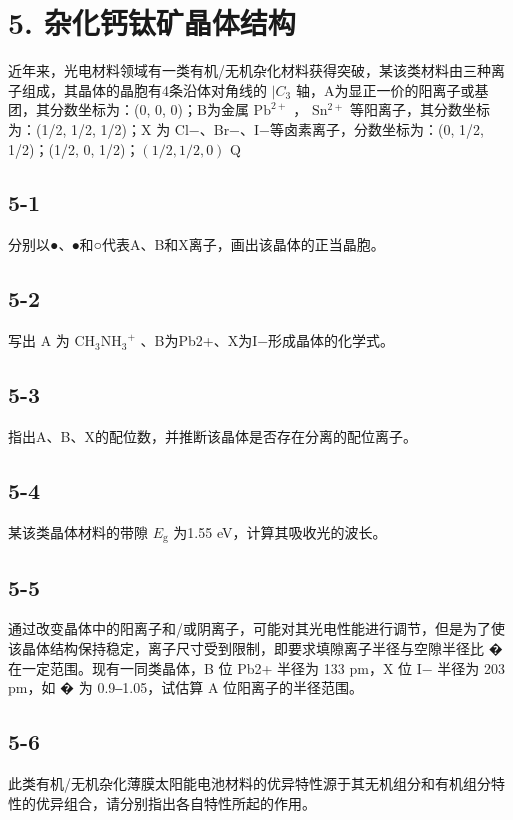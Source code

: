\section*{5. 杂化钙钛矿晶体结构}
近年来，光电材料领域有⼀类有机/⽆机杂化材料获得突破，某该类材料由三种离⼦组成，其晶体的晶胞有4条沿体对⻆线的 $\lvert C _ { 3 }$ 轴，A为显正⼀价的阳离⼦或基团，其分数坐标为：(0, 0, 0)；B为⾦属 $\mathrm { P b ^ { 2 + } }$ ， $\mathrm { S n ^ { 2 + } }$ 等阳离⼦，其分数坐标为：(1/2, 1/2, 1/2)；X 为 Cl−、Br−、I−等⻧素离⼦，分数坐标为：(0, 1/2, 1/2)；(1/2, 0, 1/2)；$( 1 / 2 , 1 / 2 , 0 )$ Q

\subsection*{5-1}
分别以●、⦁和○代表A、B和X离⼦，画出该晶体的正当晶胞。

\subsection*{5-2}
写出 A 为 $\mathrm { C H _ { 3 } N H _ { 3 } } ^ { + }$ 、B为Pb2+、X为I−形成晶体的化学式。

\subsection*{5-3}
指出A、B、X的配位数，并推断该晶体是否存在分离的配位离⼦。

\subsection*{5-4}
某该类晶体材料的带隙 $E _ { \mathrm { g } }$ 为1.55 eV，计算其吸收光的波⻓。

\subsection*{5-5}
通过改变晶体中的阳离⼦和/或阴离⼦，可能对其光电性能进⾏调节，但是为了使该晶体结构保持稳定，离⼦尺⼨受到限制，即要求填隙离⼦半径与空隙半径⽐ � 在⼀定范围。现有⼀同类晶体，B 位 Pb2+ 半径为 133 pm，X 位 I− 半径为 203 pm，如 � 为 0.9‒1.05，试估算 A 位阳离⼦的半径范围。

\subsection*{5-6}
此类有机/⽆机杂化薄膜太阳能电池材料的优异特性源于其⽆机组分和有机组分特性的优异组合，请分别指出各⾃特性所起的作⽤。
